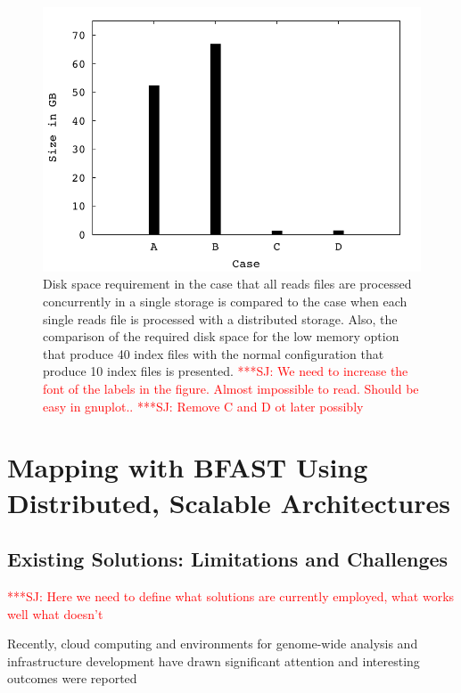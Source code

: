 \documentclass[12pt]{article}
\newcommand{\jhanote}[1]{ {\textcolor{red}     {***SJ: #1}}}
\newcommand{\jhanote}[1]{}
\begin{document}
\begin{figure}
 \centering
\includegraphics[scale=0.66]{figures/diskspace.pdf}
\caption{\small Disk space requirement in the case that all reads
  files are processed concurrently in a single storage is compared to
  the case when each single reads file is processed with a distributed
  storage.  Also, the comparison of the required disk space for the
  low memory option that produce 40 index files with the normal
  configuration that produce 10 index files is presented. \jhanote{We
    need to increase the font of the labels in the figure. Almost
    impossible to read. Should be easy in gnuplot..} \jhanote{Remove C and D ot later possibly}}
  \label{fig:diskspace} 
 \end{figure}

\section{Mapping with BFAST Using Distributed, Scalable Architectures}

\subsection{Existing Solutions: Limitations and Challenges}

\jhanote{Here we need to define what solutions are currently employed, what works well
  what doesn't}

Recently, cloud computing and environments for genome-wide analysis and infrastructure development have drawn significant attention and interesting outcomes were reported\cite{taylor2010,cloudburst, cloudblast, langmead2009, langmead2010,gatk, halligan2009}
\end{document}
